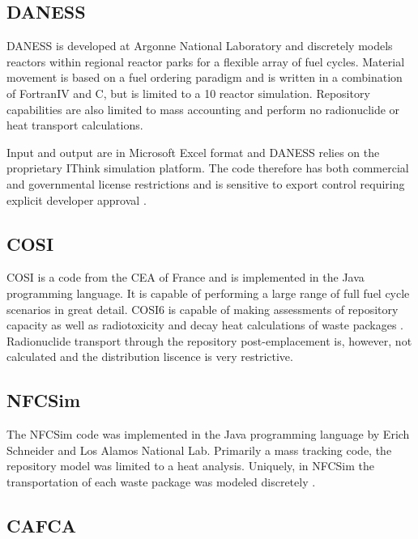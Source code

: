 \subsection{DANESS} 

\gls{DANESS} is developed at Argonne National Laboratory and
discretely models reactors within regional reactor parks for a flexible array 
of fuel cycles. Material movement is based on a fuel ordering paradigm and is 
written in a combination of FortranIV and C, but is limited to a 10 reactor 
simulation.  Repository capabilities are also limited to mass accounting and 
perform no radionuclide or heat transport calculations. 

Input and output are in Microsoft Excel format and \gls{DANESS} relies on the 
proprietary IThink simulation platform. The code therefore has both commercial 
and governmental license restrictions and is sensitive to export control 
requiring explicit developer approval 
\cite{yacout_daness_2011,van_den_durpel_daness:_2006}. 



\subsection{COSI}

\gls{COSI} is a code from the \gls{CEA} of France and is implemented in the Java programming 
language. It is capable of performing a large range of full fuel cycle 
scenarios in great detail. COSI6 is capable of making assessments of repository capacity as 
well as radiotoxicity and decay heat calculations of waste packages
\cite{boucher_international_2010}. Radionuclide transport through the repository 
post-emplacement is, however, not calculated and the distribution liscence is 
very restrictive.


\subsection{NFCSim}

The \gls{NFCSim} code was implemented in the Java programming language by Erich 
Schneider and Los Alamos National Lab. Primarily a mass tracking code, the 
repository model was limited to a heat analysis. Uniquely, in NFCSim the 
transportation of each waste package was modeled discretely 
\cite{schneider_nfcsim_2004}.

\subsection{CAFCA}

